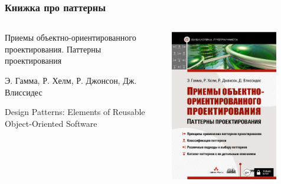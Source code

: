 \documentclass{../../slides-style}
\begin{document}
    \begin{frame}
        \frametitle{Книжка про паттерны}
        \begin{columns}
            \begin{column}{0.6\textwidth}
                Приемы объектно-ориентированного проектирования. Паттерны проектирования

                Э. Гамма, Р. Хелм, Р. Джонсон, Дж. Влиссидес

                Design Patterns: Elements of Reusable Object-Oriented Software
            \end{column}
            \begin{column}{0.4\textwidth}
                \begin{center}
                    \includegraphics[width=0.8\textwidth]{patternBookCover.png}
                \end{center}
            \end{column}
        \end{columns}
    \end{frame}
\end{document}

